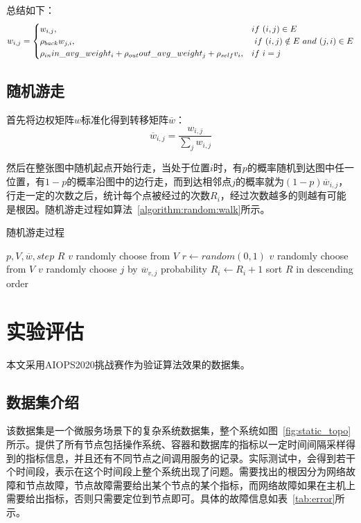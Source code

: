 总结如下：
\begin{equation*}
w_{i,j} = \begin{cases} w_{i,j}, & if\ (i,j) \in E \cr \rho_{back} w_{j,i}, &\ if\ (i,j) \notin E\ and\  (j,i) \in E \cr \rho_{in} in\_avg\_weight_{i} + \rho_{out} out\_avg\_weight_{j}+ \rho_{self}  v_i, & if\ i=j \end{cases}
\end{equation*}

\subsection{随机游走}
首先将边权矩阵$w$标准化得到转移矩阵$\overline{w}$：
\begin{equation*}
  \overline{w}_{i,j} = \frac{w_{i,j}}{\sum_jw_{i,j}}
\end{equation*}

然后在整张图中随机起点开始行走，当处于位置$i$时，有$p$的概率随机到达图中任一位置，有$1-p$的概率沿图中的边行走，而到达相邻点$j$的概率就为$(1-p)\overline{w}_{i,j}$，行走一定的次数之后，统计每个点被经过的次数$R_i$，经过次数越多的则越有可能是根因。随机游走过程如算法~\ref{algorithm:random:walk}所示。

\begin{algorithm}
  \caption{随机游走过程}
  \begin{algorithmic}[1]
      \Require $p,V,\overline{w},step$
      \Ensure $R$
      \State $v$ \gets randomly choose from $V$
      \Repeat
      \State $r \gets random(0,1)$
        \State $v$ \gets randomly choose from $V$
      \Else
        \State $v$ \gets randomly choose $j$ by $\overline{w}_{v,j}$ probability
      \EndIf
      \State $R_i \gets R_i + 1 $
      \State sort $R$ in descending order
  \end{algorithmic}
  \label{algorithm:random:walk}
\end{algorithm}
\section{实验评估}
本文采用AIOPS2020挑战赛作为验证算法效果的数据集。

\subsection{数据集介绍}

该数据集是一个微服务场景下的复杂系统数据集，整个系统如图~\ref{fig:static_topo}所示。提供了所有节点包括操作系统、容器和数据库的指标以一定时间间隔采样得到的指标信息，并且还有不同节点之间调用服务的记录。实际测试中，会得到若干个时间段，表示在这个时间段上整个系统出现了问题。需要找出的根因分为网络故障和节点故障，节点故障需要给出某个节点的某个指标，而网络故障如果在主机上需要给出指标，否则只需要定位到节点即可。具体的故障信息如表~\ref{tab:error}所示。

